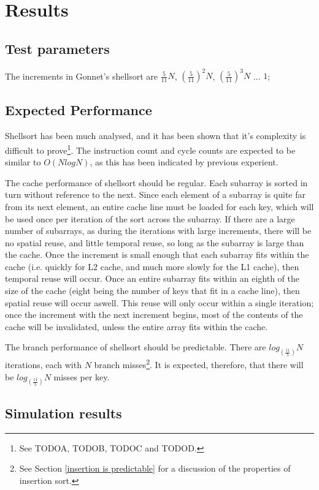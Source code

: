 \section{Results}
\subsection{Test parameters}
The increments in Gonnet's shellsort are $\frac{5}{11}N$, $(\frac{5}{11})^2N$,
$(\frac{5}{11})^3N$ ... $1$;

\subsection{Expected Performance}
Shellsort has been much analysed, and it has been shown that it's complexity is
difficult to prove\footnote{See TODOA, TODOB, TODOC and TODOD.}. The instruction
count and cycle counts are expected to be similar to $O(NlogN)$, as this has
been indicated by previous experient. 


The cache performance of shellsort should be regular. Each subarray is sorted in
turn without reference to the next. Since each element of a subarray is quite
far from its next element, an entire cache line must be loaded for each key,
which will be used once per iteration of the sort across the subarray. If there
are a large number of subarrays, as during the iterations with large increments,
there will be no spatial reuse, and little temporal reuse, so long as the
subarray is large than the cache. Once the increment is small enough that each
subarray fits within the cache (i.e. quickly for L2 cache, and much more slowly
for the L1 cache), then temporal reuse will occur. Once an entire subarray fits
within an eighth of the size of the cache (eight being the number of keys
that fit in a cache line), then spatial reuse will occur aswell.  This reuse
will only occur within a single iteration; once the increment with the next
increment begins, most of the contents of the cache will be invalidated, unless
the entire array fits within the cache.

The branch performance of shellsort should be predictable. There are
$log_{(\frac{11}{5})}N$ iterations, each with $N$ branch misses\footnote{See Section
\ref{insertion is predictable} for a discussion of the properties of insertion
sort.}. It is expected, therefore, that there will be $log_{(\frac{11}{5})}N$ misses per
key.

\subsection{Simulation results}

